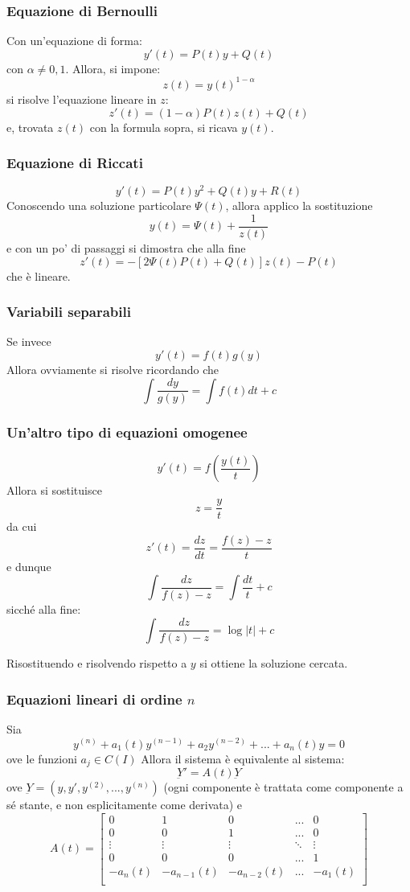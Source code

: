 \documentclass[a4paper,12pt]{article}
\begin{document}
\subsubsection{Equazione di Bernoulli}
Con un'equazione di forma:
$$y'(t) = P(t)y+Q(t)$$
con $\alpha \neq 0, 1$. Allora, si impone:
$$ z(t)=y(t)^{1-\alpha} $$
si risolve l'equazione lineare in $z$: $$z'(t)=(1-\alpha)P(t)z(t)+Q(t)$$ e, trovata $z(t)$ con la formula sopra, si ricava $y(t)$.

\subsubsection{Equazione di Riccati}
$$y'(t) = P(t)y^2+Q(t)y+R(t)$$
Conoscendo una soluzione particolare $\Psi(t)$, allora applico la sostituzione
$$y(t)=\Psi(t)+\dfrac{1}{z(t)}$$
e con un po' di passaggi si dimostra che alla fine
$$z'(t)= -\left[2\Psi(t)P(t)+Q(t)\right]z(t)-P(t)$$
che è lineare.
\subsubsection{Variabili separabili}
Se invece
$$y'(t) = f(t)g(y)$$
Allora ovviamente si risolve ricordando che
$$\int\dfrac{dy}{g(y)}=\int f(t)dt + c$$
\subsubsection{Un'altro tipo di equazioni omogenee}
$$y'(t) = f\left(\dfrac{y(t)}{t}\right)$$
Allora si sostituisce
$$z=\dfrac{y}{t}$$
da cui $$z'(t) = \dfrac{dz}{dt} = \dfrac{f(z)-z}{t}$$
e dunque
$$\int\dfrac{dz}{f(z)-z}=\int \dfrac{dt}{t} + c$$
sicché alla fine:
$$\int\dfrac{dz}{f(z)-z} = \log|t| + c$$

Risostituendo e risolvendo rispetto a $y$ si ottiene la soluzione cercata.

\subsubsection{Equazioni lineari di ordine $n$}
Sia
$$y^{(n)} + a_1(t)y^{(n-1)} + a_2y^{(n-2)} + ... + a_n(t)y = 0$$
ove le funzioni $a_j \in C(I)$
Allora il sistema è equivalente al sistema:
$$\underbar{Y}' = A(t)\underbar{Y}$$
ove $\underbar{Y}=(y, y', y^{(2)}, ..., y^{(n)})$ (ogni componente è trattata come componente a sé stante, e non esplicitamente come derivata) e
$$A(t) =
\begin{bmatrix}
0 & 1 & 0 & ... & 0\\
0 & 0 & 1 & ... & 0\\
\vdots & \vdots & \vdots & \ddots & \vdots \\
0 & 0 & 0 & ... & 1 \\
-a_n(t) & -a_{n-1}(t) & -a_{n-2}(t) & ... & -a_{1}(t) \\
\end{bmatrix}
$$
\end{document}
